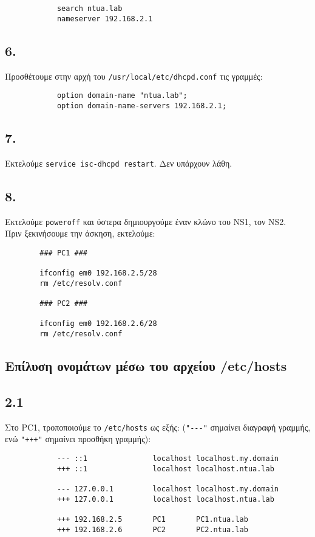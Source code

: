 \documentclass[a4paper, 12pt]{article}
\begin{document}
		\begin{verbatim}
			search ntua.lab
			nameserver 192.168.2.1
		\end{verbatim}

	\subsection*{6.}
		Προσθέτουμε στην αρχή του \verb|/usr/local/etc/dhcpd.conf| τις γραμμές:
		
		\begin{verbatim}
			option domain-name "ntua.lab";
			option domain-name-servers 192.168.2.1;
		\end{verbatim}

	\subsection*{7.}
		Εκτελούμε \verb|service isc-dhcpd restart|. Δεν υπάρχουν λάθη.

	\subsection*{8.}
		Εκτελούμε \verb|poweroff| και ύστερα δημιουργούμε έναν κλώνο του NS1, τον NS2. \\
		
	Πριν ξεκινήσουμε την άσκηση, εκτελούμε:
	
	\begin{verbatim}
		### PC1 ###
		
		ifconfig em0 192.168.2.5/28
		rm /etc/resolv.conf
		
		### PC2 ###
		
		ifconfig em0 192.168.2.6/28
		rm /etc/resolv.conf
	\end{verbatim}
	
	\subsection*{Επίλυση ονομάτων μέσω του αρχείου /etc/hosts}
	
	\subsection*{2.1}
		Στο PC1, τροποποιούμε το \verb|/etc/hosts| ως εξής: (\verb|"---"| σημαίνει διαγραφή γραμμής, ενώ \verb|"+++"| σημαίνει προσθήκη γραμμής):
		
		\begin{verbatim}
			--- ::1               localhost localhost.my.domain
			+++ ::1               localhost localhost.ntua.lab
			
			--- 127.0.0.1         localhost localhost.my.domain
			+++ 127.0.0.1         localhost localhost.ntua.lab
			
			+++ 192.168.2.5       PC1       PC1.ntua.lab
			+++ 192.168.2.6       PC2       PC2.ntua.lab
		\end{verbatim}
\end{document}
